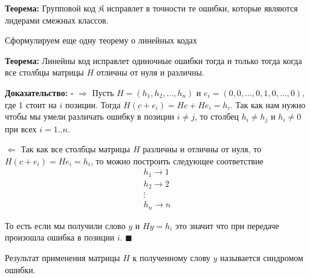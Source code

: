 \documentclass{article}
\newcommand{\THRM}[1] {
    \textbf{Теорема: } #1
}
\newcommand{\PROOF}[1] {
    \textbf{Доказательство: } $\square$ #1 $\blacksquare$
}
\begin{document}
    \THRM{Групповой код $\mathfrak{K}$ исправлет в точности те ошибки, которые являются лидерами смежных классов.}

    Сформулируем еще одну теорему о линейных кодах

    \THRM{Линейны код исправлет одиночные ошибки тогда и только тогда когда все столбцы матрицы $H$ отличны от нуля и различны.}

    \PROOF{
        $\Rightarrow$ Пусть $H = (h_1, h_2, \dots , h_n)$ и $e_i = (0, 0, \dots , 0, 1, 0, \dots , 0)$, где 1 стоит на $i$ позиции.
        Тогда $H(c + e_i) = Hc + He_i = h_i$. Так как нам нужно чтобы мы умели различать ошибку в позиции $i \neq j$, то столбец $h_i \neq h_j$ и
        $h_i \neq 0$ при всех $i = 1..n$. 

        $\Leftarrow$ Так как все столбцы матрицы $H$ различны и отличны от нуля, то $H(c + e_i) = He_i = h_i$, то можно построить следующее соответствие 
        $$
        \begin{matrix}
            h_1 \rightarrow 1 \\
            h_2 \rightarrow 2 \\
            \vdots \\
            h_n \rightarrow n
        \end{matrix}
        $$

        То есть если мы получили слово $y$ и $Hy = h_i$ это значит что при передаче произошла ошибка в позиции $i$. 
    }

    Результат применения матрицы $H$ к полученному слову $y$ называется синдромом ошибки.
\end{document}
